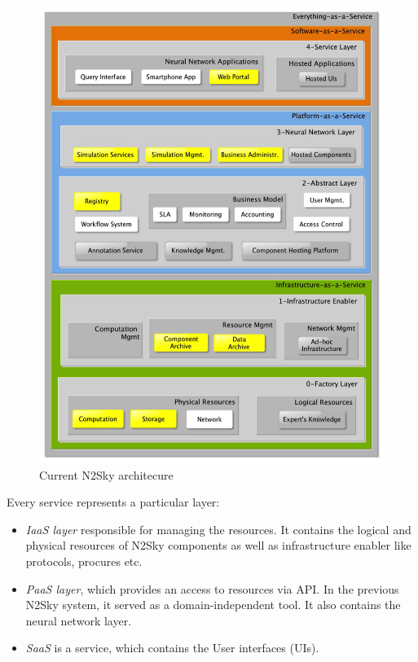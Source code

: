 \begin{figure}[htbp]
\begin{center}
  \includegraphics[width=\linewidth]{components/2/current_arch.png}
  \caption{Current N2Sky architecure}
  \label{fig:current_arch}
\end{center}
\end{figure}

Every service represents a particular layer:
\begin{itemize}
\item \emph{IaaS layer}  responsible for managing the resources. It contains the logical and physical resources of N2Sky components as well as infrastructure enabler like protocols, procures etc. 
\item \emph{PaaS layer}, which provides an access to resources via API. In the previous N2Sky system, it served as a domain-independent tool. It also contains the neural network layer.
\item \emph{SaaS} is a service, which contains the User interfaces (UIs).
\end{itemize}


